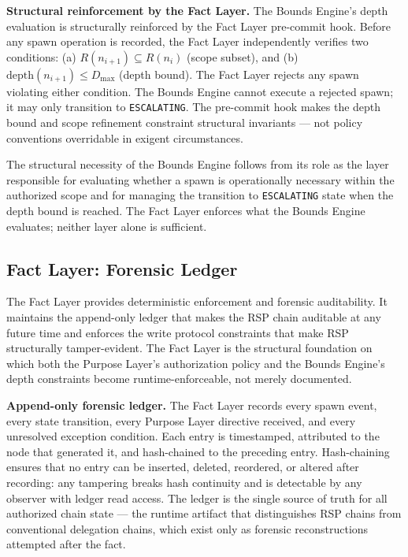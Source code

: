 \medskip
\noindent\textbf{Structural reinforcement by the Fact Layer.} The Bounds Engine's depth evaluation is structurally reinforced by the Fact Layer pre-commit hook. Before any spawn operation is recorded, the Fact Layer independently verifies two conditions: (a) $R(n_{i+1}) \subseteq R(n_i)$ (scope subset), and (b) $\mathrm{depth}(n_{i+1}) \leq D_{\mathrm{max}}$ (depth bound). The Fact Layer rejects any spawn violating either condition. The Bounds Engine cannot execute a rejected spawn; it may only transition to \texttt{ESCALATING}. The pre-commit hook makes the depth bound and scope refinement constraint structural invariants --- not policy conventions overridable in exigent circumstances.

The structural necessity of the Bounds Engine follows from its role as the layer responsible for evaluating whether a spawn is operationally necessary within the authorized scope and for managing the transition to \texttt{ESCALATING} state when the depth bound is reached. The Fact Layer enforces what the Bounds Engine evaluates; neither layer alone is sufficient.

\subsection{Fact Layer: Forensic Ledger}
\label{sec:rs-fact-ledger}

The Fact Layer provides deterministic enforcement and forensic auditability. It maintains the append-only ledger that makes the RSP chain auditable at any future time and enforces the write protocol constraints that make RSP structurally tamper-evident. The Fact Layer is the structural foundation on which both the Purpose Layer's authorization policy and the Bounds Engine's depth constraints become runtime-enforceable, not merely documented.

\medskip
\noindent\textbf{Append-only forensic ledger.} The Fact Layer records every spawn event, every state transition, every Purpose Layer directive received, and every unresolved exception condition. Each entry is timestamped, attributed to the node that generated it, and hash-chained to the preceding entry. Hash-chaining ensures that no entry can be inserted, deleted, reordered, or altered after recording: any tampering breaks hash continuity and is detectable by any observer with ledger read access. The ledger is the single source of truth for all authorized chain state --- the runtime artifact that distinguishes RSP chains from conventional delegation chains, which exist only as forensic reconstructions attempted after the fact.

